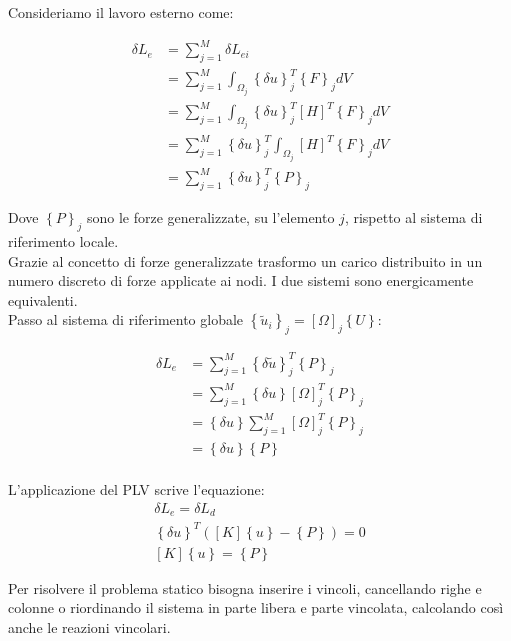 Consideriamo il lavoro esterno come: 


\begin{align*}
 \delta L_{e} &=\sum_{j=1}^M \delta L_{ei} \\
 &= \sum^M_{j=1} \int_{\Omega_j}     \left\{\delta u\right\}_j^T  \left\{F\right\}_j  dV\\
  &= \sum^M_{j=1} \int_{\Omega_j}     \left\{\delta u\right\}_j^T  [H]^T \left\{F\right\}_j  dV\\
   &= \sum^M_{j=1}  \left\{\delta u\right\}_j^T\int_{\Omega_j}      [H]^T \left\{F\right\}_j  dV\\
     &= \sum^M_{j=1}  \left\{\delta u\right\}_j^T  \left\{P\right\}_j  
\end{align*}

Dove $\left\{P\right\}_j  $ sono le forze generalizzate, su l'elemento $j$, rispetto al sistema di riferimento locale.\\
Grazie al concetto di forze generalizzate trasformo un carico distribuito in un numero discreto di forze applicate ai nodi. I due sistemi sono energicamente equivalenti.\\ Passo al sistema di riferimento globale $\left\{ \tilde{u}_i\right\}_j =   [\Omega]_j  \left\{ U\right\} $:

\begin{align*}
 \delta L_{e} &= \sum^M_{j=1}  \left\{\delta \tilde{u}\right\}_j^T  \left\{P\right\}_j  \\
 &= \sum^M_{j=1}  \left\{\delta u\right\}  [\Omega]_j^T \left\{P\right\}_j  \\
 &=  \left\{\delta u\right\}  \sum^M_{j=1} [\Omega]_j^T \left\{P\right\}_j  \\
  &=  \left\{\delta u\right\}  \left\{P\right\}  \\
\end{align*}

L'applicazione del PLV scrive l'equazione:
\begin{align*}
 \delta L_{e} = \delta L_d\\
 \left\{\delta u\right\}^T ([K]\left\{ u\right\}   -  \left\{P\right\})=0\\
 [K]\left\{ u\right\}=\left\{P\right\}
\end{align*}

Per risolvere il problema statico bisogna inserire i vincoli, cancellando righe e colonne o riordinando il sistema in parte libera e parte vincolata, calcolando così anche le reazioni vincolari.

